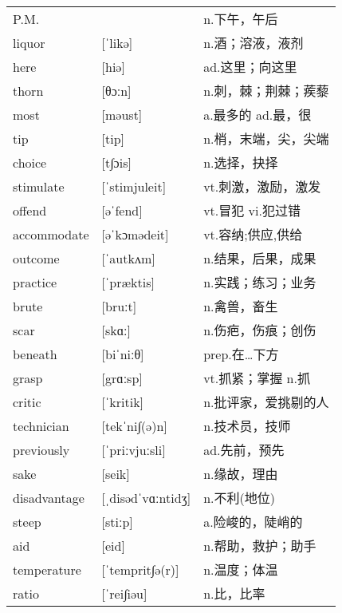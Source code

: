 \documentclass[a4paper]{article}
\begin{document}
\section{}
\begin{tabular}{l l l}

P.M. &  & n.下午，午后 \\
liquor & [ˈlikə] & n.酒；溶液，液剂 \\
here & [hiə] & ad.这里；向这里 \\
thorn & [θɔːn] & n.刺，棘；荆棘；蒺藜 \\
most & [məust] & a.最多的 ad.最，很 \\
tip & [tip] & n.梢，末端，尖，尖端 \\
choice & [t∫ɔis] & n.选择，抉择 \\
stimulate & [ˈstimjuleit] & vt.刺激，激励，激发 \\
offend & [əˈfend] & vt.冒犯 vi.犯过错 \\
accommodate & [əˈkɔmədeit] & vt.容纳;供应,供给 \\
outcome & [ˈautkʌm] & n.结果，后果，成果 \\
practice & [ˈpræktis] & n.实践；练习；业务 \\
brute & [bruːt] & n.禽兽，畜生 \\
scar & [skɑː] & n.伤疤，伤痕；创伤 \\
beneath & [biˈniːθ] & prep.在…下方 \\
grasp & [grɑːsp] & vt.抓紧；掌握 n.抓 \\
critic & [ˈkritik] & n.批评家，爱挑剔的人 \\
technician & [tekˈni∫(ə)n] & n.技术员，技师 \\
previously & [ˈpriːvjuːsli] & ad.先前，预先 \\
sake & [seik] & n.缘故，理由 \\
disadvantage & [ˌdisədˈvɑːntidʒ] & n.不利(地位) \\
steep & [stiːp] & a.险峻的，陡峭的 \\
aid & [eid] & n.帮助，救护；助手 \\
temperature & [ˈtemprit∫ə(r)] & n.温度；体温 \\
ratio & [ˈrei∫iəu] & n.比，比率 \\

\end{tabular}
\end{document}
